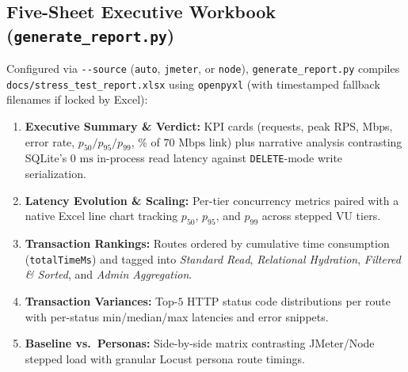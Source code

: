 \documentclass[11pt,letterpaper]{article}
\begin{document}
\subsection{Five-Sheet Executive Workbook (\texttt{generate\_report.py})}
Configured via \texttt{-{}-source} (\texttt{auto}, \texttt{jmeter}, or \texttt{node}), \texttt{generate\_report.py} compiles \texttt{docs/\allowbreak stress\_test\_report.xlsx} using \texttt{openpyxl} (with timestamped fallback filenames if locked by Excel):
\begin{enumerate}
  \item \textbf{Executive Summary \& Verdict:} KPI cards (requests, peak RPS, Mbps, error rate, $p_{50}/p_{95}/p_{99}$, $\%$ of $70\text{ Mbps}$ link) plus narrative analysis contrasting SQLite's $0\text{ ms}$ in-process read latency against \texttt{DELETE}-mode write serialization.
  \item \textbf{Latency Evolution \& Scaling:} Per-tier concurrency metrics paired with a native Excel line chart tracking $p_{50}$, $p_{95}$, and $p_{99}$ across stepped VU tiers.
  \item \textbf{Transaction Rankings:} Routes ordered by cumulative time consumption (\texttt{totalTimeMs}) and tagged into \emph{Standard Read}, \emph{Relational Hydration}, \emph{Filtered \& Sorted}, and \emph{Admin Aggregation}.
  \item \textbf{Transaction Variances:} Top-$5$ HTTP status code distributions per route with per-status min/median/max latencies and error snippets.
  \item \textbf{Baseline vs.\ Personas:} Side-by-side matrix contrasting JMeter/Node stepped load with granular Locust persona route timings.
\end{enumerate}
\end{document}
